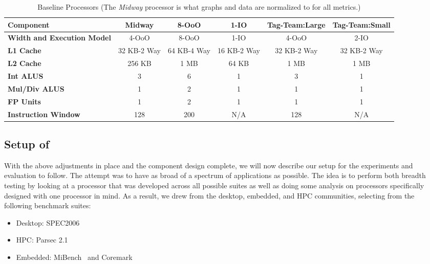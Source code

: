\begin{center}
\begin{table*}[ht]
{\small
\hfill{}
\begin{tabular}{|l|c|c|c|c|c|}
\hline
\textbf{Component}&\textbf{Midway}&\textbf{8-OoO}&\textbf{1-IO}&\textbf{Tag-Team:Large}&\textbf{Tag-Team:Small}\\
\hline
\textbf{Width and Execution Model}&4-OoO&8-OoO&1-IO&4-OoO&2-IO\\
\hline
\textbf{L1 Cache}&32 KB-2 Way&64 KB-4 Way&16 KB-2 Way&32 KB-2 Way&32 KB-2 Way\\
\hline
\textbf{L2 Cache}&256 KB&1 MB&64 KB&1 MB&1 MB\\
\hline 
\textbf{Int ALUS}&3&6&1&3&1\\
\hline
\textbf{Mul/Div ALUS}&1&2&1&1&1\\
\hline
\textbf{FP Units}&1&2&1&1&1\\
\hline
\textbf{Instruction Window}&128&200&N/A&128&N/A\\
\hline
\end{tabular}}
\hfill{}
\caption{Baseline Processors (The \emph{Midway} processor is what graphs and data are normalized to for all metrics.)}
\label{table:procsundertest}
\end{table*}
\end{center}

\subsection{Setup of \blackBox{}}

With the above adjustments in place and the component design complete, we will
now describe our setup for the experiments and evaluation to follow. The 
attempt was to have as broad of a spectrum of applications as possible. The idea 
is to perform both breadth testing by looking at a processor that was
developed across all possible suites as well as doing some analysis on processors
specifically designed with one processor in mind. As a result, we drew from 
the desktop, embedded, and HPC communities, selecting from the following 
benchmark suites:

\begin{itemize}
\item Desktop: SPEC2006~\cite{spec2006}
\item HPC: Parsec 2.1~\cite{parsec}
\item Embedded: MiBench~\cite{mibench} and Coremark~\cite{coremark}
\end{itemize}

